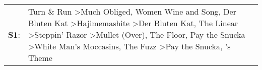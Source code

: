 \begin{supertabular}{p{0.03\textwidth}p{0.92\textwidth}}
 \textbf{S1}:  &  Turn \& Run\textsuperscript{} \textgreater \enspace Much Obliged\textsuperscript{}, \enspace Women Wine and Song\textsuperscript{}, \enspace Der Bluten Kat\textsuperscript{} \textgreater \enspace Hajimemashite\textsuperscript{} \textgreater \enspace Der Bluten Kat\textsuperscript{}, \enspace The Linear\textsuperscript{} \textgreater \enspace Steppin' Razor\textsuperscript{} \textgreater \enspace Mullet (Over)\textsuperscript{}, \enspace The Floor\textsuperscript{}, \enspace Pay the Snucka\textsuperscript{} \textgreater \enspace White Man's Moccasins\textsuperscript{}, \enspace The Fuzz\textsuperscript{} \textgreater \enspace Pay the Snucka\textsuperscript{}, 's Theme\textsuperscript{}  \enspace  \\
\end{supertabular}
